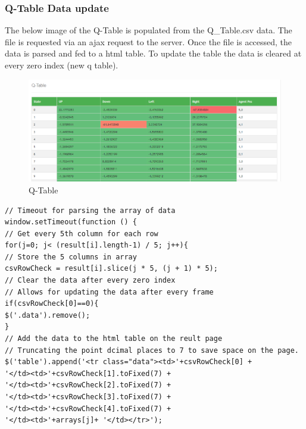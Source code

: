 \subsubsection{Q-Table Data update}
The below image of the Q-Table is populated from the Q\_Table.csv data. The file is requested via an ajax request to the server. Once the file is accessed, the data is parsed and fed to a html table. 
To update the table the data is cleared at every zero index (new q table).

\begin{figure}[H]
	\centering
	\includegraphics[width=0.7\linewidth]{img/qtable}
	\caption{Q-Table}
	\label{fig:qtable}
\end{figure}
\begin{verbatim}
// Timeout for parsing the array of data
window.setTimeout(function () {
// Get every 5th column for each row
for(j=0; j< (result[i].length-1) / 5; j++){
// Store the 5 columns in array
csvRowCheck = result[i].slice(j * 5, (j + 1) * 5);
// Clear the data after every zero index
// Allows for updating the data after every frame
if(csvRowCheck[0]==0){
$('.data').remove();
}
// Add the data to the html table on the reult page
// Truncating the point dcimal places to 7 to save space on the page.
$('table').append('<tr class="data"><td>'+csvRowCheck[0] + 
'</td><td>'+csvRowCheck[1].toFixed(7) + 
'</td><td>'+csvRowCheck[2].toFixed(7) + 
'</td><td>'+csvRowCheck[3].toFixed(7) +
'</td><td>'+csvRowCheck[4].toFixed(7) + 
'</td><td>'+arrays[j]+ '</td></tr>');
\end{verbatim}
